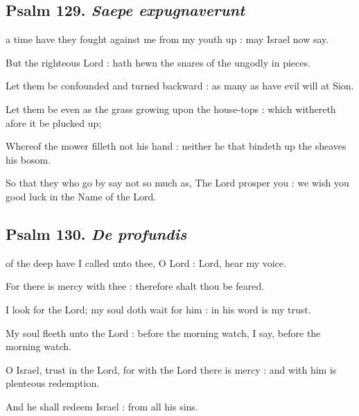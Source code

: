 \subsection{Psalm 129. \textit{Saepe expugnaverunt}}

 a time have they fought against me from my youth up : may Israel now say.\par
{}
But the righteous Lord : hath hewn the snares of the ungodly in pieces.\par
{}Let them be confounded and turned backward : as many as have evil will at Sion.\par
{}Let them be even as the grass growing upon the house-tops : which withereth afore it be plucked up;\par
{}Whereof the mower filleth not his hand : neither he that bindeth up the sheaves his bosom.\par
{}So that they who go by say not so much as, The Lord prosper you : we wish you good luck in the Name of the Lord.\par

\subsection{Psalm 130. \textit{De profundis}}

 of the deep have I called unto thee, O Lord : Lord, hear my voice.\par
{}
For there is mercy with thee : therefore shalt thou be feared.\par
{}I look for the Lord; my soul doth wait for him : in his word is my trust.\par
{}My soul fleeth unto the Lord : before the morning watch, I say, before the morning watch.\par
{}O Israel, trust in the Lord, for with the Lord there is mercy : and with him is plenteous redemption.\par
{}And he shall redeem Israel : from all his sins.\par

